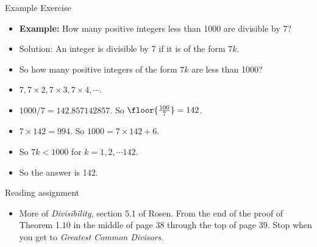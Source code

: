 \documentclass[handout]{beamer}
\begin{document}
\begin{frame}{Example Exercise}

\begin{itemize}
  \item \textbf{Example:} How many positive integers less than 1000 are divisible
  by 7?
  \item Solution: An integer is divisible by 7 if it is of the form $7k$.
  \item So how many positive integers of the form $7k$ are less than 1000?
  \item $7, 7\times 2, 7\times 3, 7\times 4, \cdots$.
  \item $1000/7 = 142.857142857$. So $\floor{\frac{100}{7}} = 142$.
  \item $7\times 142 = 994$. So $1000 = 7 \times 142 + 6$.
  \item So $7k < 1000$ for $k=1,2,\cdots 142$.
  \item So the answer is 142.
\end{itemize}

\end{frame}

\begin{frame}{Reading assignment}

\begin{itemize}
  \item More of \emph{Divisibility}, section 5.1 of Rosen. From the end
  of the proof of Theorem 1.10 in the middle of page 38
  through the top of page 39. Stop when you get to
  \emph{Greatest Common Divisors}.
\end{itemize}

\end{frame}
\end{document}
